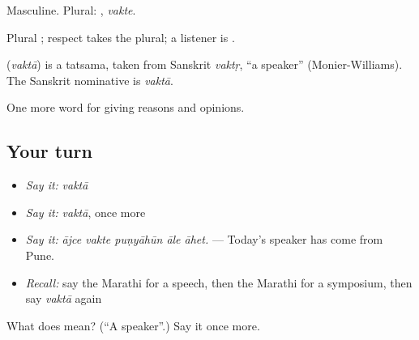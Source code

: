 Masculine. Plural: , \emph{vakte}.

Plural ; respect takes the plural; a listener is .

\begin{cousinweb}
\textbf{} (\emph{vaktā}) is a tatsama, taken from Sanskrit \emph{vaktṛ}, \textquotedblleft{}a speaker\textquotedblright{} (Monier-Williams). The Sanskrit nominative is \emph{vaktā}.
\end{cousinweb}

\begin{grammarlens}[title={What you've built}]
One more word for giving reasons and opinions.
\end{grammarlens}

\subsection*{Your turn}
\begin{itemize}
\raggedright
  \item \emph{Say it:} \emph{vaktā}
  \item \emph{Say it:} \emph{vaktā}, once more
  \item \emph{Say it:} \emph{ājce vakte puṇyāhūn āle āhet.} — Today's speaker has come from Pune.
  \item \emph{Recall:} say the Marathi for a speech, then the Marathi for a symposium, then say \emph{vaktā} again
\end{itemize}

\begin{tcolorbox}[breakable,colback=teal!4,colframe=teal!35!black,title={Before you move on}]
What does  mean? (\textquotedblleft{}A speaker\textquotedblright{}.) Say it once more.
\end{tcolorbox}
